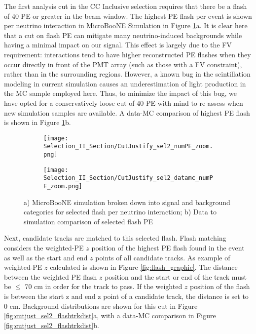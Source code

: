 The first analysis cut in the CC Inclusive selection requires that there be a flash of 40 PE or greater in the beam window. The highest PE flash per event is shown per neutrino interaction in MicroBooNE Simulation in Figure \ref{fig:cutjust_sel2_numPE}a. It is clear here that a cut on flash PE can mitigate many neutrino-induced backgrounds while having a minimal impact on our signal.  This effect is largely due to the FV requirement: interactions tend to have higher reconstructed PE flashes when they occur directly in front of the PMT array (such as those with a FV constraint), rather than in the surrounding regions. However, a known bug in the scintillation modeling in current simulation causes an underestimation of light production in the MC sample employed here.  Thus, to minimize the impact of this bug, we have opted for a conservatively loose cut of 40 PE with mind to re-assess when new simulation samples are available.  A data-MC comparison of highest PE flash is shown in Figure \ref{fig:cutjust_sel2_numPE}b.


\begin{figure}[H]
  \begin{subfigure}[t]{0.4\textwidth}
    \texttt{[image: Selection\_II\_Section/CutJustify\_sel2\_numPE\_zoom.png]}
    \caption{ }
  \end{subfigure}
    \hspace{10 mm}
   \begin{subfigure}[t]{0.4\textwidth}
    \texttt{[image: Selection\_II\_Section/CutJustify\_sel2\_datamc\_numPE\_zoom.png]}
    \caption{ }
  \end{subfigure}
\caption{a) MicroBooNE simulation broken down into signal and background categories for selected flash per neutrino interaction; b) Data to simulation comparison of selected flash PE  }
\label{fig:cutjust_sel2_numPE}
\end{figure}


\par Next, candidate tracks are matched to this selected flash.  Flash matching considers the weighted-PE $z$ position of the highest PE flash found in the event as well as the start and end $z$ points of all candidate tracks. As example of weighted-PE $z$ calculated is shown in Figure \ref{fig:flash_graphic}.  The distance between the weighted PE flash $z$ position and the start or end of the track must be $\leq$ 70 cm in order for the track to pass. If the weighted $z$ position of the flash is between the start z and end z point of a candidate track, the distance is set to 0 cm.  Background distributions are shown for this cut in Figure \ref{fig:cutjust_sel2_flashtrkdist}a, with a data-MC comparison in Figure \ref{fig:cutjust_sel2_flashtrkdist}b. 

